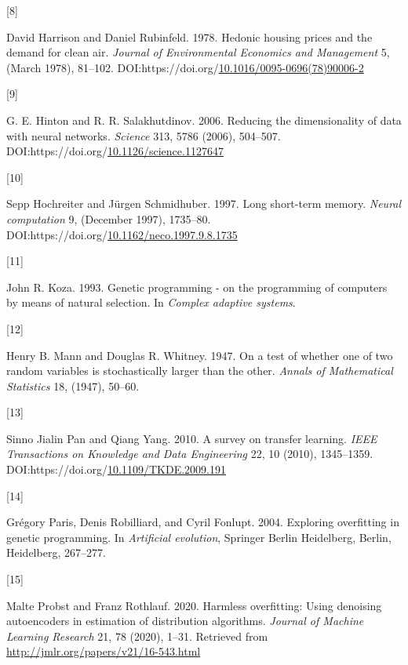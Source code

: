 \documentclass[
  11pt,
]{article}
\newlength{\cslhangindent}
\newlength{\csllabelwidth}
\newlength{\cslentryspacingunit} %
\newenvironment{CSLReferences}[2] %
 {%
  \setlength{\parindent}{0pt}
  \ifodd #1
  \let\oldpar\par
  \def\par{\hangindent=\cslhangindent\oldpar}
  \fi
  \setlength{\parskip}{#2\cslentryspacingunit}
 }%
 {}
\newcommand{\CSLLeftMargin}[1]{\parbox[t]{\csllabelwidth}{#1}}
\newcommand{\CSLRightInline}[1]{\parbox[t]{\linewidth - \csllabelwidth}{#1}\break}
\begin{document}
\begin{CSLReferences}{0}{0}
\leavevmode{}%
\CSLLeftMargin{{[}8{]} }%
\CSLRightInline{David Harrison and Daniel Rubinfeld. 1978. Hedonic housing prices and the demand for clean air. \emph{Journal of Environmental Economics and Management} 5, (March 1978), 81--102. DOI:https://doi.org/\href{https://doi.org/10.1016/0095-0696(78)90006-2}{10.1016/0095-0696(78)90006-2}}

\leavevmode{}%
\CSLLeftMargin{{[}9{]} }%
\CSLRightInline{G. E. Hinton and R. R. Salakhutdinov. 2006. Reducing the dimensionality of data with neural networks. \emph{Science} 313, 5786 (2006), 504--507. DOI:https://doi.org/\href{https://doi.org/10.1126/science.1127647}{10.1126/science.1127647}}

\leavevmode{}%
\CSLLeftMargin{{[}10{]} }%
\CSLRightInline{Sepp Hochreiter and Jürgen Schmidhuber. 1997. Long short-term memory. \emph{Neural computation} 9, (December 1997), 1735--80. DOI:https://doi.org/\href{https://doi.org/10.1162/neco.1997.9.8.1735}{10.1162/neco.1997.9.8.1735}}

\leavevmode{}%
\CSLLeftMargin{{[}11{]} }%
\CSLRightInline{John R. Koza. 1993. Genetic programming - on the programming of computers by means of natural selection. In \emph{Complex adaptive systems}.}

\leavevmode{}%
\CSLLeftMargin{{[}12{]} }%
\CSLRightInline{Henry B. Mann and Douglas R. Whitney. 1947. On a test of whether one of two random variables is stochastically larger than the other. \emph{Annals of Mathematical Statistics} 18, (1947), 50--60.}

\leavevmode{}%
\CSLLeftMargin{{[}13{]} }%
\CSLRightInline{Sinno Jialin Pan and Qiang Yang. 2010. A survey on transfer learning. \emph{IEEE Transactions on Knowledge and Data Engineering} 22, 10 (2010), 1345--1359. DOI:https://doi.org/\href{https://doi.org/10.1109/TKDE.2009.191}{10.1109/TKDE.2009.191}}

\leavevmode{}%
\CSLLeftMargin{{[}14{]} }%
\CSLRightInline{Grégory Paris, Denis Robilliard, and Cyril Fonlupt. 2004. Exploring overfitting in genetic programming. In \emph{Artificial evolution}, Springer Berlin Heidelberg, Berlin, Heidelberg, 267--277.}

\leavevmode{}%
\CSLLeftMargin{{[}15{]} }%
\CSLRightInline{Malte Probst and Franz Rothlauf. 2020. Harmless overfitting: Using denoising autoencoders in estimation of distribution algorithms. \emph{Journal of Machine Learning Research} 21, 78 (2020), 1--31. Retrieved from \url{http://jmlr.org/papers/v21/16-543.html}}


\end{CSLReferences}
\end{document}

